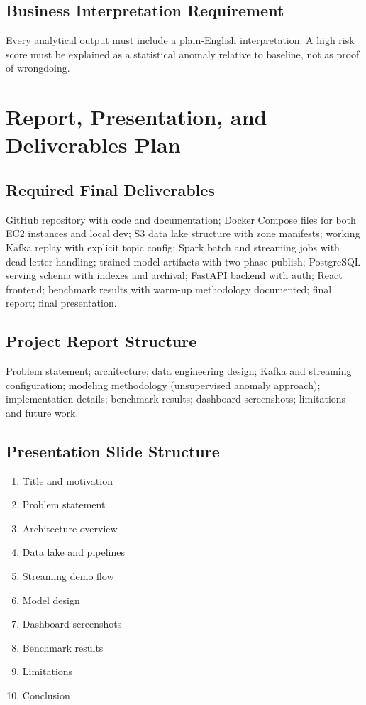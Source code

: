 \documentclass[11pt,a4paper]{article}
\begin{document}
\subsection{Business Interpretation Requirement}

Every analytical output must include a plain-English interpretation. A high risk score must be
explained as a statistical anomaly relative to baseline, not as proof of wrongdoing.

\section{Report, Presentation, and Deliverables Plan}

\subsection{Required Final Deliverables}

GitHub repository with code and documentation; Docker Compose files for both EC2 instances and
local dev; S3 data lake structure with zone manifests; working Kafka replay with explicit topic
config; Spark batch and streaming jobs with dead-letter handling; trained model artifacts with
two-phase publish; PostgreSQL serving schema with indexes and archival; FastAPI backend with auth;
React frontend; benchmark results with warm-up methodology documented; final report; final
presentation.

\subsection{Project Report Structure}

Problem statement; architecture; data engineering design; Kafka and streaming configuration;
modeling methodology (unsupervised anomaly approach); implementation details; benchmark results;
dashboard screenshots; limitations and future work.

\subsection{Presentation Slide Structure}

\begin{enumerate}[nosep]
  \item Title and motivation
  \item Problem statement
  \item Architecture overview
  \item Data lake and pipelines
  \item Streaming demo flow
  \item Model design
  \item Dashboard screenshots
  \item Benchmark results
  \item Limitations
  \item Conclusion
\end{enumerate}
\end{document}
